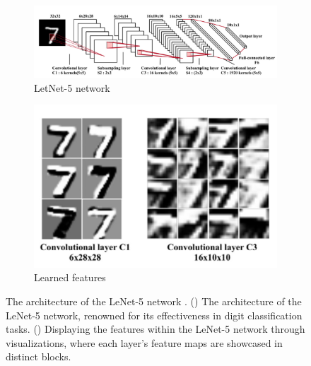 \begin{figure}[h!]
	\centering
	
	\begin{subfigure}{0.65\textwidth}
		\includegraphics[width=\linewidth]{Images/DataMining/LetNet5ArchitectureNetwork}
		\caption{LetNet-5 network}    %
		\label{subfig:LetNet5ArchitectureNetwork}
	\end{subfigure}
	\hfill
	\begin{subfigure}{0.3\textwidth}
		\includegraphics[width=\linewidth]{Images/DataMining/LetNet5ArchitectureLearnedFeatures}
		\caption{Learned features}    %
		\label{subfig:LetNet5ArchitectureLearnedFeatures}
	\end{subfigure}
	
	\caption{The architecture of the LeNet-5 network \cite{Gu:2018}. () The architecture of the LeNet-5 network, renowned for its effectiveness in digit classification tasks. () Displaying the features within the LeNet-5 network through visualizations, where each layer's feature maps are showcased in distinct blocks.}
	\label{fig:LetNet5Architecture}
\end{figure}

